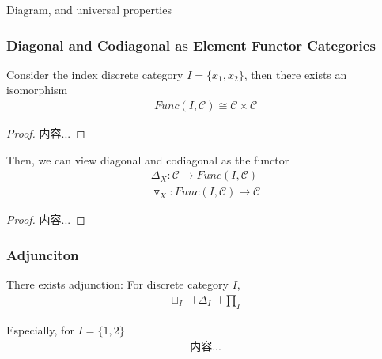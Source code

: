 \documentclass[Total.tex]{subfiles}
\begin{document}
			Diagram, and universal properties
			
			\begin{center}
			\end{center}
			\subsubsection{Diagonal and Codiagonal as Element Functor Categories}
				\begin{lemma}
					Consider the index discrete category  $I=\{x_1,x_2\}$, then there exists an isomorphism 
					\begin{gather*}
						Func(I,\mathcal{C})\cong \mathcal{C}\times \mathcal{C}
					\end{gather*}
				\end{lemma}
				\begin{proof}
					内容...
				\end{proof}
				
				\begin{corollary}
					Then, we can view diagonal and codiagonal as the functor
					\begin{gather*}
						\Delta_X:\mathcal{C}\rightarrow Func(I,\mathcal{C})\\
						\triangledown_X:Func(I,\mathcal{C})\rightarrow \mathcal{C}
					\end{gather*}
				\end{corollary}
				\begin{proof}
					内容...
				\end{proof}
				
				\subsubsection{Adjunciton}
				
				\begin{proposition}
					There exists adjunction: For discrete category $I$,
					\begin{gather*}
						\sqcup_I \dashv \Delta_I\dashv \prod_I
					\end{gather*}
					
					Especially, for $I=\{1,2\}$
					\begin{gather*}
						内容...
					\end{gather*}
				\end{proposition}
				
\end{document}
